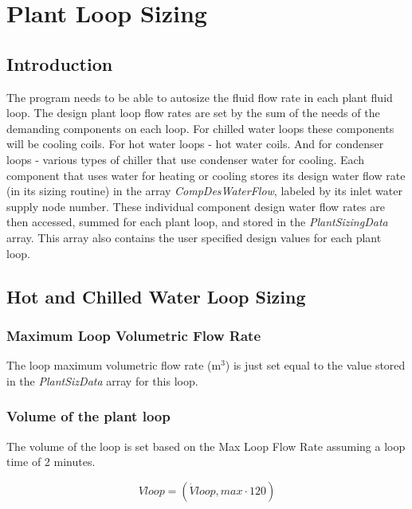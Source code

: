 \section{Plant Loop Sizing}\label{plant-loop-sizing}

\subsection{Introduction}\label{introduction-000}

The program needs to be able to autosize the fluid flow rate in each plant fluid loop. The design plant loop flow rates are set by the sum of the needs of the demanding components on each loop. For chilled water loops these components will be cooling coils. For hot water loops - hot water coils. And for condenser loops - various types of chiller that use condenser water for cooling. Each component that uses water for heating or cooling stores its design water flow rate (in its sizing routine) in the array \emph{CompDesWaterFlow}, labeled by its inlet water supply node number. These individual component design water flow rates are then accessed, summed for each plant loop, and stored in the \emph{PlantSizingData} array. This array also contains the user specified design values for each plant loop.

\subsection{Hot and Chilled Water Loop Sizing}\label{hot-and-chilled-water-loop-sizing}

\subsubsection{Maximum Loop Volumetric Flow Rate}\label{maximum-loop-volumetric-flow-rate}

The loop maximum volumetric flow rate (m\(^{3}\)) is just set equal to the value stored in the \emph{PlantSizData} array for this loop.

\subsubsection{Volume of the plant loop}\label{volume-of-the-plant-loop}

The volume of the loop is set based on the Max Loop Flow Rate assuming a loop time of 2 minutes.

\begin{equation}
Vloop = (\dot Vloop,max\cdot 120)
\end{equation}

